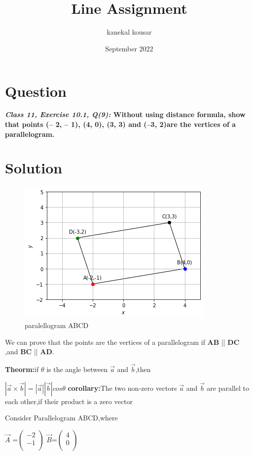 \documentclass[journal,12pt,twocolumn]{IEEEtran}
\title{\textbf{\\Line Assignment}}
\author{kanekal kousar}
\date{September 2022}
\begin{document}
\maketitle


\section{Question}
\textbf{\textit{Class 11, Exercise 10.1, Q(9):} Without using distance formula, show that points (– 2, – 1), (4, 0), (3, 3) and (–3, 2)are the vertices of a parallelogram.}

\section{Solution}
\raggedright 

\begin{figure}[h!]
\centering
\includegraphics[scale=0.5]{fig/paralellogram.png} 
\caption{paralellogram ABCD}
\end{figure}

\vspace{0.25cm}
We can prove that the points are the vertices of a parallelogram if  \textbf{AB} || \textbf{DC} ,and \textbf{BC} || \textbf{AD}.
\vspace{0.3cm}

\textbf{Theorm:}if $\theta$ is the angle between $\vec{a}$ and $\vec{b}$,then

\hspace{3cm}
\boldmath
	$|\vec{a}\times \vec{b}|=|\vec{a}|| \vec{b}|cos\theta$
\unboldmath
\vspace{0.25cm}
\textbf{corollary:}The two non-zero vectors $\vec{a}$ and $\vec{b}$ are parallel to each other,if their product is a zero vector


Consider  Parallelogram ABCD,where

$ \vec{A}$ =$\begin{pmatrix}-2 \\ -1 \\ \end{pmatrix}$ \hspace{0.3cm} $ \vec{B} $=$\begin{pmatrix} 4\\ 0 \\ \end{pmatrix}$ 
\end{document}

